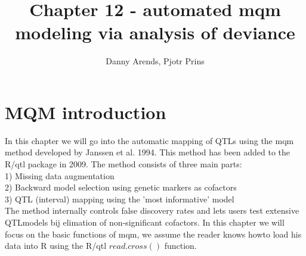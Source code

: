 \documentclass[11pt]{article}
\title { Chapter 12 - automated mqm modeling via analysis of deviance }
\author { Danny Arends, Pjotr Prins }
\begin{document}
\maketitle
\clearpage
\section{MQM introduction}
In this chapter we will go into the automatic mapping of QTLs using the mqm method developed by Janssen et al. 1994\cite{jansen94}. This method has been added to the R/qtl\cite{broman09}\cite{broman03} package in 2009. The method consists of three main parts:\\
1) Missing data augmentation\\
2) Backward model selection using genetic markers as cofactors\\
3) QTL (interval) mapping using the 'most informative' model\\
The method internally controls false discovery rates and lets users test extensive QTLmodels bij elimation of non-significant cofactors.
In this chapter we will focus on the basic functions of mqm, we assume the reader knows howto load his data into R using the R/qtl $read.cross()$ 
function.
\end{document}
